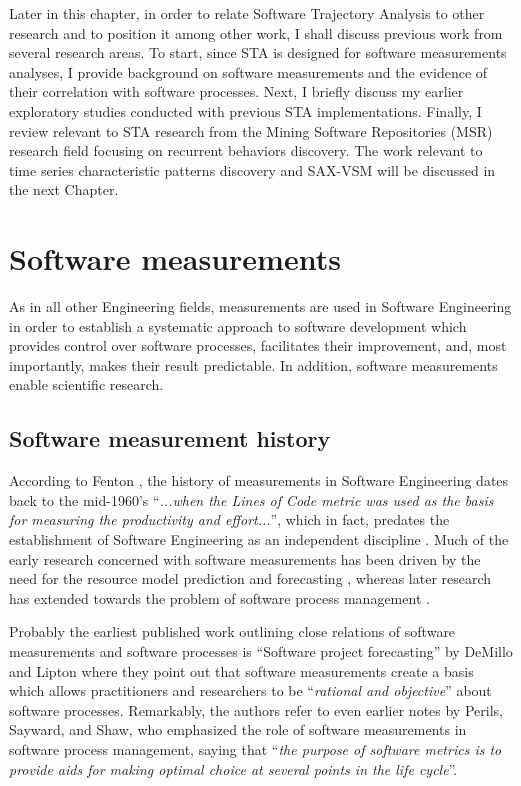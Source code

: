Later in this chapter, in order to relate Software Trajectory Analysis to other research and to position 
it among other work, I shall discuss previous work from several research areas.
To start, since STA is designed for software measurements analyses, I provide background on software 
measurements and the evidence of their correlation with software processes. 
Next, I briefly discuss my earlier exploratory studies conducted with previous STA implementations. 
Finally, I review relevant to STA research from the Mining Software Repositories (MSR) research field 
focusing on recurrent behaviors discovery.
The work relevant to time series characteristic patterns discovery and SAX-VSM will be discussed 
in the next Chapter.

\section{Software measurements}
As in all other Engineering fields, measurements are used in Software Engineering in order to establish a 
systematic approach to software development which provides control over software processes, facilitates
their improvement, and, most importantly, makes their result predictable. 
In addition, software measurements enable scientific research.

\subsection{Software measurement history}
According to Fenton \cite{citeulike:1525462}, the history of measurements in Software Engineering dates 
back to the mid-1960's  ``\textit{...when the Lines of Code metric was used as the basis for measuring the 
productivity and effort...}'', which in fact, predates the establishment of Software Engineering as an 
independent discipline \cite{naur_crisis_68}. 
Much of the early research concerned with software measurements has been driven by the need for the resource model 
prediction and forecasting \cite{citeulike:1525462}, whereas later research has extended towards the problem 
of software process management \cite{citeulike:13158802}.

Probably the earliest published work outlining close relations of software measurements and software 
processes is ``Software project forecasting'' by DeMillo and Lipton \cite{demillo1980software} where they 
point out that software measurements create a basis which allows practitioners and researchers to be 
``\textit{rational and objective}'' about software processes. 
Remarkably, the authors refer to even earlier notes by Perils, Sayward, and Shaw, who emphasized the role of software 
measurements in software process management, saying that ``\textit{the purpose of software metrics is 
to provide aids for making optimal choice at several points in the life cycle}''.

